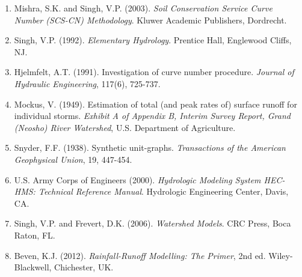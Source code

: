 \documentclass[a4paper, 11pt]{article}
\begin{document}
\begin{enumerate}
\item Mishra, S.K. and Singh, V.P. (2003). \textit{Soil Conservation Service Curve Number (SCS-CN)
Methodology}. Kluwer Academic Publishers, Dordrecht.

\item Singh, V.P. (1992). \textit{Elementary Hydrology}. Prentice Hall, Englewood Cliffs, NJ.

\item Hjelmfelt, A.T. (1991). Investigation of curve number procedure. \textit{Journal of
Hydraulic Engineering}, 117(6), 725-737.

\item Mockus, V. (1949). Estimation of total (and peak rates of) surface runoff for individual
storms. \textit{Exhibit A of Appendix B, Interim Survey Report, Grand (Neosho) River Watershed},
U.S. Department of Agriculture.

\item Snyder, F.F. (1938). Synthetic unit-graphs. \textit{Transactions of the American Geophysical
Union}, 19, 447-454.

\item U.S. Army Corps of Engineers (2000). \textit{Hydrologic Modeling System HEC-HMS: Technical
Reference Manual}. Hydrologic Engineering Center, Davis, CA.

\item Singh, V.P. and Frevert, D.K. (2006). \textit{Watershed Models}. CRC Press, Boca Raton, FL.

\item Beven, K.J. (2012). \textit{Rainfall-Runoff Modelling: The Primer}, 2nd ed. Wiley-Blackwell,
Chichester, UK.
\end{enumerate}
\end{document}
